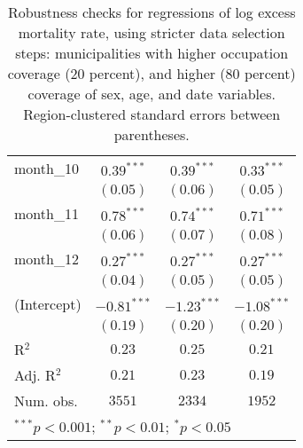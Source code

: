 \begin{table}[h!]
\begin{center}
\begin{small}
\begin{tabular}{l c c c}
month\_10      & $0.39^{***}$  & $0.39^{***}$  & $0.33^{***}$  \\
               & $(0.05)$      & $(0.06)$      & $(0.05)$      \\
month\_11      & $0.78^{***}$  & $0.74^{***}$  & $0.71^{***}$  \\
               & $(0.06)$      & $(0.07)$      & $(0.08)$      \\
month\_12      & $0.27^{***}$  & $0.27^{***}$  & $0.27^{***}$  \\
               & $(0.04)$      & $(0.05)$      & $(0.05)$      \\
(Intercept)    & $-0.81^{***}$ & $-1.23^{***}$ & $-1.08^{***}$ \\
               & $(0.19)$      & $(0.20)$      & $(0.20)$      \\
\hline
R$^2$          & $0.23$        & $0.25$        & $0.21$        \\
Adj. R$^2$     & $0.21$        & $0.23$        & $0.19$        \\
Num. obs.      & $3551$        & $2334$        & $1952$        \\
\hline
\multicolumn{4}{l}{\tiny{$^{***}p<0.001$; $^{**}p<0.01$; $^{*}p<0.05$}}
\end{tabular}
\end{small}
\caption{Robustness checks for regressions of log excess mortality rate, using stricter data selection steps: municipalities with higher occupation coverage (20 percent), and higher (80 percent) coverage of sex, age, and date variables. Region-clustered standard errors between parentheses.}
\label{tab:cutoffmodels}
\end{center}
\end{table}

